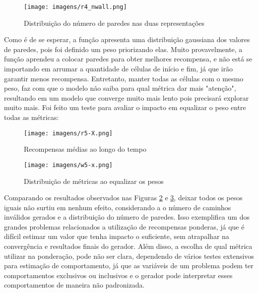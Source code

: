 \begin{figure}[htb]
	\caption{\label{r4_nwall}Distribuição do número de paredes nas duas representações}
	\begin{center}
	    \texttt{[image: imagens/r4\_nwall.png]}
	\end{center}
\end{figure}

\FloatBarrier

Como é de se esperar, a função apresenta uma distribuição gaussiana dos valores de paredes, pois foi definido um peso priorizando elas.
Muito provavelmente, a função aprendeu a colocar paredes para obter melhores recompensa, e não está se importando em arrumar a quantidade
de células de início e fim, já que irão garantir menos recompensa. Entretanto, manter todas as células com o mesmo peso, faz com que o modelo
não saiba para qual métrica dar mais "atenção", resultando em um modelo que converge muito mais lento pois precisará explorar muito mais.
Foi feito um teste para avaliar o impacto em equalizar o peso entre todas as métricas:

\begin{figure}[htb]
	\caption{\label{r5-X}Recompensas médias ao longo do tempo}
	\begin{center}
	    \texttt{[image: imagens/r5-X.png]}
	\end{center}
\end{figure}

\begin{figure}[htb]
	\caption{\label{w5-x}Distribuição de métricas ao equalizar os pesos}
	\begin{center}
	    \texttt{[image: imagens/w5-x.png]}
	\end{center}
\end{figure}

\FloatBarrier
Comparando os resultados observados nas Figuras \ref{r5-X} e \ref{w5-x}, 
deixar todos os pesos iguais não surtiu em nenhum efeito, considerando 
a o número de caminhos inválidos gerados e a distribuição do número de paredes. Isso exemplifica um dos grandes
problemas relacionados a utilização de recompensas ponderas, já que é difícil estimar um valor que tenha impacto 
o suficiente, sem atrapalhar na convergência e resultados finais do gerador. Além disso, a escolha de qual 
métrica utilizar na ponderação, pode não ser clara, dependendo de vários testes extensivos para estimação de comportamento,
já que as variáveis de um problema podem ter comportamentos exclusivos ou inclusivos e o gerador pode interpretar
esses comportamentos de maneira não padronizada.



